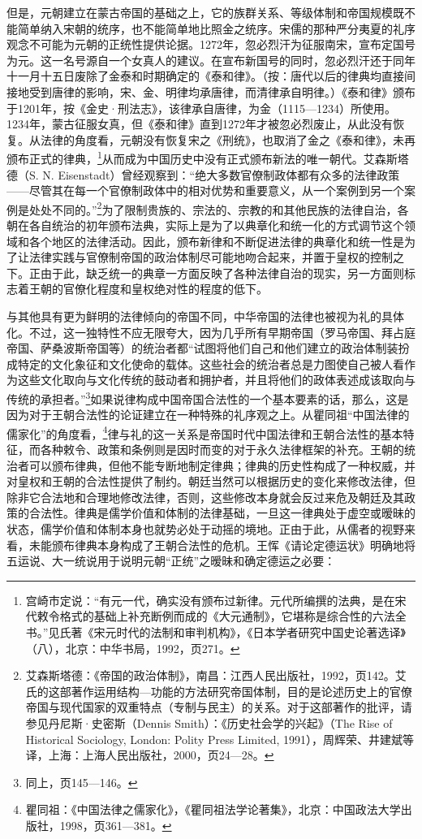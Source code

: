 \documentclass[a4paper, 12pt, openright]{ctexbook}
\begin{document}
但是，元朝建立在蒙古帝国的基础之上，它的族群关系、等级体制和帝国规模既不能简单纳入宋朝的统序，也不能简单地比照金之统序。宋儒的那种严分夷夏的礼序观念不可能为元朝的正统性提供论据。1272年，忽必烈汗为征服南宋，宣布定国号为元。这一名号源自一个女真人的建议。在宣布新国号的同时，忽必烈汗还于同年十一月十五日废除了金泰和时期确定的《泰和律》。（按：唐代以后的律典均直接间接地受到唐律的影响，宋、金、明律均承唐律，而清律承自明律。）《泰和律》颁布于1201年，按《金史·刑法志》，该律承自唐律，为金（1115—1234）所使用。1234年，蒙古征服女真，但《泰和律》直到1272年才被忽必烈废止，从此没有恢复。从法律的角度看，元朝没有恢复宋之《刑统》，也取消了金之《泰和律》，未再颁布正式的律典，\footnote{宫崎市定说：“有元一代，确实没有颁布过新律。元代所编撰的法典，是在宋代敕令格式的基础上补充断例而成的《大元通制》，它堪称是综合性的六法全书。”见氏著《宋元时代的法制和审判机构》，《日本学者研究中国史论著选译》（八），北京：中华书局，1992，页271。}从而成为中国历史中没有正式颁布新法的唯一朝代。艾森斯塔德（S. N. Eisenstadt）曾经观察到：“绝大多数官僚制政体都有众多的法律政策——尽管其在每一个官僚制政体中的相对优势和重要意义，从一个案例到另一个案例是处处不同的。”\footnote{艾森斯塔德：《帝国的政治体制》，南昌：江西人民出版社，1992，页142。艾氏的这部著作运用结构—功能的方法研究帝国体制，目的是论述历史上的官僚帝国与现代国家的双重特点（专制与民主）的关系。对于这部著作的批评，请参见丹尼斯·史密斯（Dennis Smith）：《历史社会学的兴起》（The Rise of Historical Sociology, London: Polity Press Limited, 1991），周辉荣、井建斌等译，上海：上海人民出版社，2000，页24—28。}为了限制贵族的、宗法的、宗教的和其他民族的法律自治，各朝在各自统治的初年颁布法典，实际上是为了以典章化和统一化的方式调节这个领域和各个地区的法律活动。因此，颁布新律和不断促进法律的典章化和统一性是为了让法律实践与官僚制帝国的政治体制尽可能地吻合起来，并置于皇权的控制之下。正由于此，缺乏统一的典章一方面反映了各种法律自治的现实，另一方面则标志着王朝的官僚化程度和皇权绝对性的程度的低下。

与其他具有更为鲜明的法律倾向的帝国不同，中华帝国的法律也被视为礼的具体化。不过，这一独特性不应无限夸大，因为几乎所有早期帝国（罗马帝国、拜占庭帝国、萨桑波斯帝国等）的统治者都“试图将他们自己和他们建立的政治体制装扮成特定的文化象征和文化使命的载体。这些社会的统治者总是力图使自己被人看作为这些文化取向与文化传统的鼓动者和拥护者，并且将他们的政体表述成该取向与传统的承担者。”\footnote{同上，页145—146。}如果说律构成中国帝国合法性的一个基本要素的话，那么，这是因为对于王朝合法性的论证建立在一种特殊的礼序观之上。从瞿同祖“中国法律的儒家化”的角度看，\footnote{瞿同祖：《中国法律之儒家化》，《瞿同祖法学论著集》，北京：中国政法大学出版社，1998，页361—381。}律与礼的这一关系是帝国时代中国法律和王朝合法性的基本特征，而各种敕令、政策和条例则是因时而变的对于永久法律框架的补充。王朝的统治者可以颁布律典，但他不能专断地制定律典；律典的历史性构成了一种权威，并对皇权和王朝的合法性提供了制约。朝廷当然可以根据历史的变化来修改法律，但除非它合法地和合理地修改法律，否则，这些修改本身就会反过来危及朝廷及其政策的合法性。律典是儒学价值和体制的法律基础，一旦这一律典处于虚空或暧昧的状态，儒学价值和体制本身也就势必处于动摇的境地。正由于此，从儒者的视野来看，未能颁布律典本身构成了王朝合法性的危机。王恽《请论定德运状》明确地将五运说、大一统说用于说明元朝“正统”之暧昧和确定德运之必要：
\end{document}
